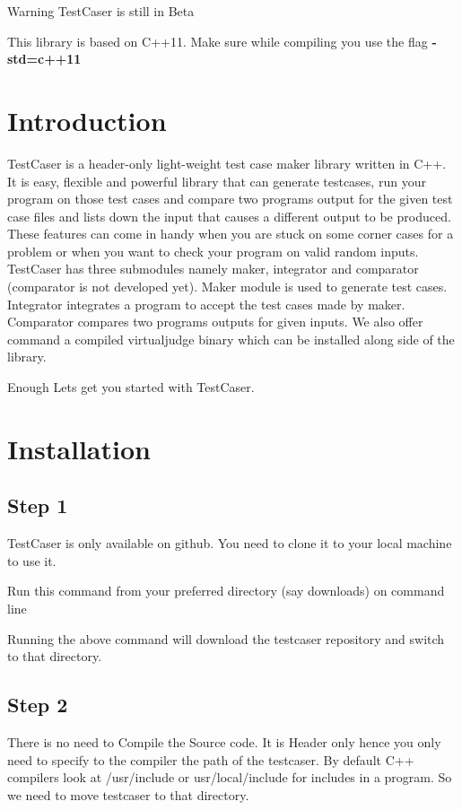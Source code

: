 \begin{DoxyWarning}{Warning}
Test\+Caser is still in Beta

This library is based on C++11. Make sure while compiling you use the flag {\bfseries{-\/std=c++11}}
\end{DoxyWarning}
\hypertarget{index_sec_intro}{}\section{Introduction}\label{index_sec_intro}
Test\+Caser is a header-\/only light-\/weight test case maker library written in C++. It is easy, flexible and powerful library that can generate testcases, run your program on those test cases and compare two program\textquotesingle{}s output for the given test case files and lists down the input that causes a different output to be produced. These features can come in handy when you are stuck on some corner cases for a problem or when you want to check your program on valid random inputs. Test\+Caser has three submodules namely maker, integrator and comparator (comparator is not developed yet). Maker module is used to generate test cases. Integrator integrates a program to accept the test cases made by maker. Comparator compares two program\textquotesingle{}s outputs for given inputs. We also offer command a compiled virtualjudge binary which can be installed along side of the library.

Enough Let\textquotesingle{}s get you started with Test\+Caser.

\DoxyHorRuler
\hypertarget{index_sec_install}{}\section{Installation}\label{index_sec_install}
\hypertarget{index_step1}{}\subsection{Step 1}\label{index_step1}
Test\+Caser is only available on github. You need to clone it to your local machine to use it.

Run this command from your preferred directory (say downloads) on command line 
\begin{DoxyCode}{0}
\end{DoxyCode}
 Running the above command will download the testcaser repository and switch to that directory.\hypertarget{index_step2}{}\subsection{Step 2}\label{index_step2}
There is no need to Compile the Source code. It is Header only hence you only need to specify to the compiler the path of the testcaser. By default C++ compilers look at {\ttfamily /usr/include} or {\ttfamily usr/local/include} for includes in a program. So we need to move testcaser to that directory.

